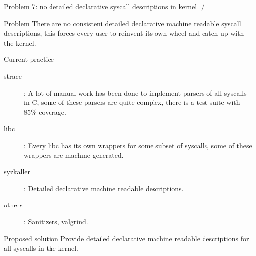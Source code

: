\documentclass[unicode,aspectratio=169]{beamer}
\begin{document}
\begin{frame}{Problem 7: no detailed declarative syscall descriptions in kernel \hfill [\insertframenumber/\inserttotalframenumber]}

\begin{block}{Problem}
There are no consistent detailed declarative machine readable syscall descriptions,
this forces every user to reinvent its own wheel and catch up with the kernel.
\end{block}

\begin{block}{Current practice}
\begin{description}
\item[strace]: A lot of manual work has been done to implement parsers of all syscalls in C,
some of these parsers are quite complex, there is a test suite with 85\% coverage.
\item[libc]: Every libc has its own wrappers for some subset of syscalls,
some of these wrappers are machine generated.
\item[syzkaller]: Detailed declarative machine readable descriptions.
\item[others]: Sanitizers, valgrind.
\end{description}
\end{block}

\begin{block}{Proposed solution}
Provide detailed declarative machine readable descriptions for all syscalls in the kernel.
\end{block}
\end{frame}
\end{document}
